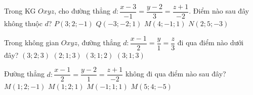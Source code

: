 \begin{ex}%
	Trong KG $Oxyz$, cho đường thẳng $d\colon \dfrac{x-3}{-1}=\dfrac{y-2}{3}=\dfrac{z+1}{-2}$. Điểm nào sau đây không thuộc $d$?
	\choice
	{$ P\left(3;2;-1\right)$}
	{\True $Q\left(-3;-2;1\right)$}
	{$ M\left(4;-1;1\right)$}
	{$ N\left(2;5;-3\right)$}
\end{ex}

\begin{ex}%
	Trong không gian $ Oxyz$, đường thẳng $ d\colon \dfrac{x-1}{2}=\dfrac{y}{1}=\dfrac{z}{3}$ đi qua điểm nào dưới đây?
	\choice
	{$\left(3;2;3\right)$}
	{$\left(2;1;3\right)$}
	{$\left(3;1;2\right)$}
	{\True $\left(3;1;3\right)$}
\end{ex}

\begin{ex}%
	Đường thẳng $ d\colon \dfrac{x-1}{2}=\dfrac{y-2}{1}=\dfrac{z+1}{-2}$ không đi qua điểm nào sau đây?
	\choice
	{$ M\left(1;2;-1\right)$}
	{\True $ M\left(1;2;1\right)$}
	{$ M\left(-1;1;1\right)$}
	{$ M\left(5;4;-5\right)$}
	\end{ex}
	

